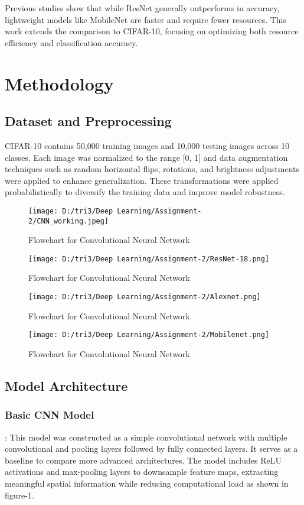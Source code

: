 \documentclass[10pt,twocolumn,letterpaper]{article}
\begin{document}
Previous studies show that while ResNet generally outperforms in accuracy, lightweight models like MobileNet are faster and require fewer resources. This work extends the comparison to CIFAR-10, focusing on optimizing both resource efficiency and classification accuracy.
\section{Methodology}
\subsection{Dataset and Preprocessing}
CIFAR-10 contains 50,000 training images and 10,000 testing images across 10 classes. Each image was normalized to the range [0, 1] and data augmentation techniques such as random horizontal flips, rotations, and brightness adjustments were applied to enhance generalization. These transformations were applied probabilistically to diversify the training data and improve model robustness.
\begin{figure}[H]
    \centering
    \texttt{[image: D:/tri3/Deep Learning/Assignment-2/CNN\_working.jpeg]}
    \caption{Flowchart for Convolutional Neural Network}
    \label{fig1: Flowchart for Convolutional Neural Network}
\end{figure}
\begin{figure}[H]
    \centering
    \texttt{[image: D:/tri3/Deep Learning/Assignment-2/ResNet-18.png]}
    \caption{Flowchart for Convolutional Neural Network}
    \label{fig1: Implementation of ResNet-18}
\end{figure}
\begin{figure}[H]
    \centering
    \texttt{[image: D:/tri3/Deep Learning/Assignment-2/Alexnet.png]}
    \caption{Flowchart for Convolutional Neural Network}
    \label{fig1: Implementation of AlexNet}
\end{figure}
\begin{figure}[H]
    \centering
    \texttt{[image: D:/tri3/Deep Learning/Assignment-2/Mobilenet.png]}
    \caption{Flowchart for Convolutional Neural Network}
    \label{fig1: Implementation of MobileNet}
\end{figure}
\subsection{Model Architecture}
\subsubsection{Basic CNN Model}: This model was constructed as a simple convolutional network with multiple convolutional and pooling layers followed by fully connected layers. It serves as a baseline to compare more advanced architectures. The model includes ReLU activations and max-pooling layers to downsample feature maps, extracting meaningful spatial information while reducing computational load as shown in figure-1.
\end{document}
